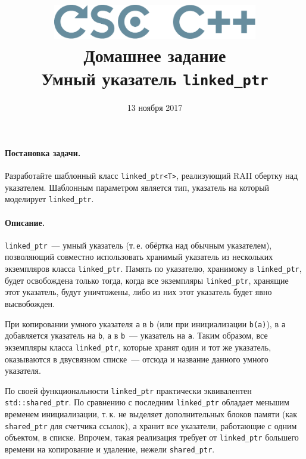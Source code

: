 \documentclass[a4paper,10pt]{article}
\begin{document}

\lstset{
  basicstyle=\ttfamily,
  columns=fullflexible
}

\newcommand{\cpp}[1]{{\tt #1}}

\title{\includegraphics[height=15mm]{../CSCCPP}\\[1em]
Домашнее задание  \\ Умный указатель \cpp{linked\_ptr}}
\preauthor{}
\author{}
\postauthor{}
\date{13 ноября 2017}

\maketitle

\paragraph{Постановка задачи.}

Разработайте шаблонный класс \cpp{linked\_ptr<T>}, реализующий RAII обертку над указателем.
Шаблонным параметром является тип, указатель на который моделирует \cpp{linked\_ptr}.

\paragraph{Описание.} \cpp{linked\_ptr}~--- умный указатель (т.\,е. обёртка над обычным указателем), позволяющий совместно использовать хранимый указатель из нескольких экземпляров класса \cpp{linked\_ptr}.
Память по указателю, хранимому в \cpp{linked\_ptr}, будет освобождена только тогда, когда все экземпляры \cpp{linked\_ptr}, хранящие этот указатель, будут уничтожены, либо из них этот указатель будет явно высвобожден.

При копировании умного указателя \cpp{a} в \cpp{b} (или при инициализации \cpp{b(a)}), в \cpp{a} добавляется указатель на \cpp{b}, а в \cpp{b}~--- указатель на \cpp{a}.
Таким образом, все экземпляры класса \cpp{linked\_ptr}, которые хранят один и тот же указатель, оказываются в двусвязном списке~--- отсюда и название данного умного указателя.

По своей функциональности \cpp{linked\_ptr} практически эквивалентен \cpp{std::shared\_ptr}.
По сравнению с последним \cpp{linked\_ptr} обладает меньшим временем инициализации,
т.\,к. не выделяет дополнительных блоков памяти (как \cpp{shared\_ptr} для счетчика ссылок),
а хранит все указатели, работающие с одним объектом, в списке. Впрочем, такая реализация требует от \cpp{linked\_ptr} большего времени на копирование и удаление, нежели \cpp{shared\_ptr}.
\end{document}
